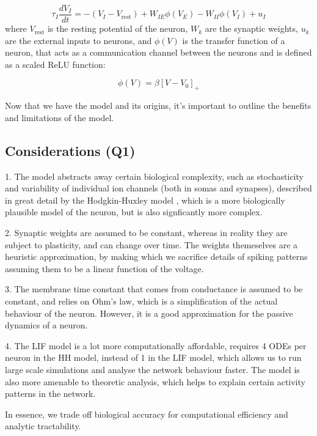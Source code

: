 \documentclass[10pt,twocolumn]{article}
\begin{document}
\begin{equation}
    \tau_I \frac{dV_I}{dt} =
    -(V_I - V_{\text{rest}})
    + W_{IE} \phi(V_E)
    - W_{II} \phi(V_I) + u_I
\end{equation}
where $V_{\text{rest}}$ is the resting potential of the neuron, $W_{k}$ are the
synaptic weights, $u_k$ are the external inputs to neurons,
and $\phi(V)$ is the transfer function of a neuron, that acts as
a communication channel between the neurons and is defined as a scaled ReLU function:

\begin{equation}
    \phi(V) = \beta[V-V_0]_+
\end{equation}

Now that we have the model and its origins, it's important to outline
the benefits and limitations of the model.

\subsection{Considerations (Q1)}
1. The model abstracts away certain biological complexity, such as stochasticity and
variability of individual ion channels (both in somas and synapses), described in
great detail by the Hodgkin-Huxley model \cite{hodgkin1952quantitative}, which is
a more biologically plausible model of the neuron,
but is also signficantly more complex.

2. Synaptic weights are assumed to be constant, whereas in reality they are
subject to plasticity, and can change over time.
The weights themeselves are a heuristic approximation,
by making which we sacrifice details of
spiking patterns assuming them to be a linear function of the voltage.

3. The membrane time constant that comes from conductance is assumed
to be constant, and relies on Ohm's law, which is a simplification of
the actual behaviour of the neuron.
However, it is a good approximation for the passive dynamics of a neuron.

4. The LIF model is a lot more computationally affordable, requires 4 ODEs
per neuron in the HH model, instead of 1 in the LIF model,
which allows us to run large scale simulations and analyse
the network behaviour faster. The model is also more amenable
to theoretic analysis, which helps to explain certain activity patterns in the network.

In essence, we trade off biological accuracy for
computational efficiency and analytic tractability.
\end{document}
